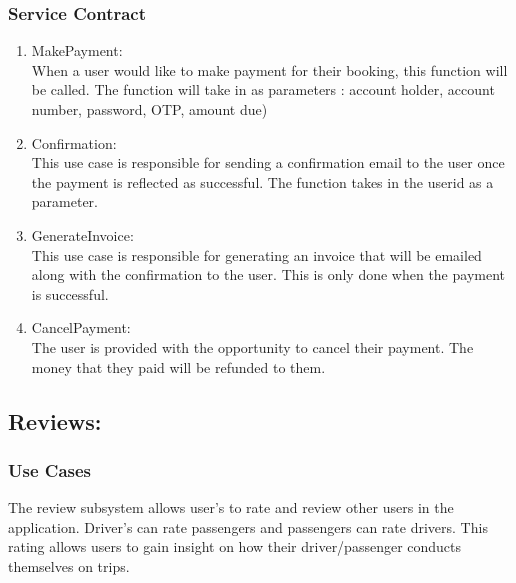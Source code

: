 \documentclass[hidelinks, 12pt, a4paper]{article}
\begin{document}
            \subsubsection{Service Contract}
             \begin{enumerate}[label=U1.\arabic*]

                \item MakePayment:\\
                When a user would like to make payment for their booking, this function will be called. The function will take in as parameters : account holder, account number, password, OTP, amount due)

                \item Confirmation:\\
                	This use case is responsible for sending a confirmation email to the user once the payment is reflected as successful. The function takes in the userid as a parameter.

                \item GenerateInvoice:\\
                This use case is responsible for generating an invoice that will be emailed along with the confirmation to the user. This is only done when the payment is successful.
                	
                \item CancelPayment: \\
            The user is provided with the opportunity to cancel their payment. The money that they paid will be refunded to them.
               
                
            \end{enumerate}
            
            \vspace{1cm}
                \subsection{Reviews:}
                \subsubsection{Use Cases}
                   The review subsystem allows user’s to rate and review other users in the application. Driver’s can rate passengers and passengers can rate drivers. This rating allows users to gain insight on how their driver/passenger conducts themselves on trips.
                    
\end{document}

